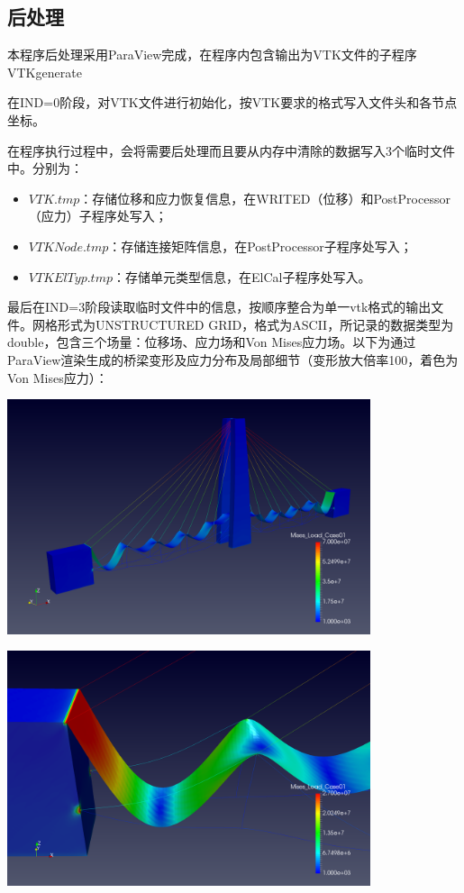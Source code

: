 \documentclass[UTF8]{ctexbook}
\begin{document}
\subsection{后处理}
本程序后处理采用ParaView完成，在程序内包含输出为VTK文件的子程序VTKgenerate

在IND=0阶段，对VTK文件进行初始化，按VTK要求的格式写入文件头和各节点坐标。

在程序执行过程中，会将需要后处理而且要从内存中清除的数据写入3个临时文件中。分别为：

\begin{itemize}
\item $VTK.tmp$：存储位移和应力恢复信息，在WRITED（位移）和PostProcessor（应力）子程序处写入；
\item $VTKNode.tmp$：存储连接矩阵信息，在PostProcessor子程序处写入；
\item $VTKElTyp.tmp$：存储单元类型信息，在ElCal子程序处写入。
\end{itemize}

最后在IND=3阶段读取临时文件中的信息，按顺序整合为单一vtk格式的输出文件。网格形式为UNSTRUCTURED GRID，格式为ASCII，所记录的数据类型为double，包含三个场量：位移场、应力场和Von Mises应力场。以下为通过ParaView渲染生成的桥梁变形及应力分布及局部细节（变形放大倍率100，着色为Von Mises应力）：
\begin{center}
\includegraphics[width=0.8\textwidth]{Bridge-3.png}

\includegraphics[width=0.8\textwidth]{Bridge-3-part.png}
\end{center}
\end{document}
